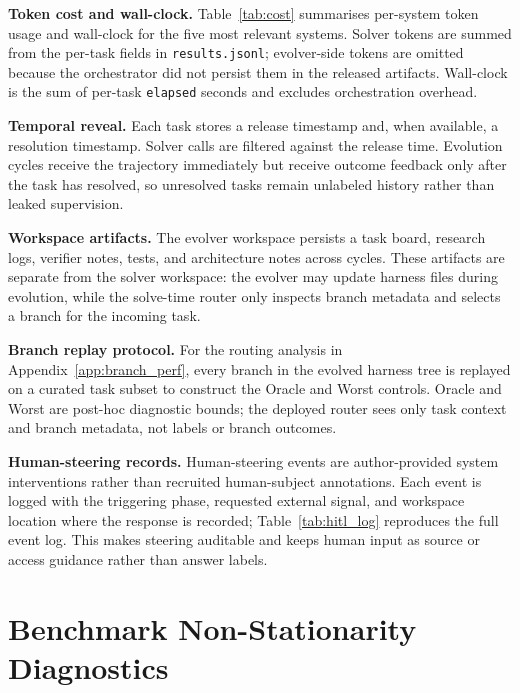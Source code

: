 

\noindent\textbf{Token cost and wall-clock.}
Table~\ref{tab:cost} summarises per-system token usage and wall-clock for the five most relevant systems. Solver tokens are summed from the per-task fields in \texttt{results.jsonl}; evolver-side tokens are omitted because the orchestrator did not persist them in the released artifacts. Wall-clock is the sum of per-task \texttt{elapsed} seconds and excludes orchestration overhead.




\noindent\textbf{Temporal reveal.}
Each task stores a release timestamp and, when available, a resolution timestamp. Solver calls are filtered against the release time. Evolution cycles receive the trajectory immediately but receive outcome feedback only after the task has resolved, so unresolved tasks remain unlabeled history rather than leaked supervision.

\noindent\textbf{Workspace artifacts.}
The evolver workspace persists a task board, research logs, verifier notes, tests, and architecture notes across cycles. These artifacts are separate from the solver workspace: the evolver may update harness files during evolution, while the solve-time router only inspects branch metadata and selects a branch for the incoming task.

\noindent\textbf{Branch replay protocol.}
For the routing analysis in Appendix~\ref{app:branch_perf}, every branch in the evolved harness tree is replayed on a curated task subset to construct the Oracle and Worst controls. Oracle and Worst are post-hoc diagnostic bounds; the deployed router sees only task context and branch metadata, not labels or branch outcomes.

\noindent\textbf{Human-steering records.}
Human-steering events are author-provided system interventions rather than recruited human-subject annotations. Each event is logged with the triggering phase, requested external signal, and workspace location where the response is recorded; Table~\ref{tab:hitl_log} reproduces the full event log. This makes steering auditable and keeps human input as source or access guidance rather than answer labels.

\section{Benchmark Non-Stationarity Diagnostics}
\label{app:nonstationarity}


